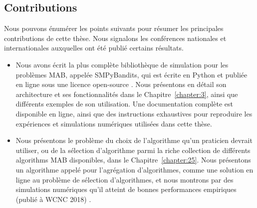 \begin{resume_fr}
\section*{Contributions}

Nous pouvons énumérer les points suivants pour résumer les principales contributions de cette thèse.
Nous signalons les conférences nationales et internationales auxquelles ont été publié certains résultats.

\begin{itemize}


    \item
    Nous avons écrit la plus complète bibliothèque de simulation pour les problèmes MAB, appelée SMPyBandits, qui est écrite en Python et publiée en ligne sous une licence open-source \cite{SMPyBanditsJMLR,SMPyBandits}.
    Nous présentons en détail son architecture et ses fonctionnalités dans le Chapitre~\ref{chapter:3}, ainsi que différents exemples de son utilisation.
    Une documentation complète est disponible en ligne, ainsi que des instructions exhaustives pour reproduire les expériences et simulations numériques utilisées dans cette thèse.

    \item
    Nous présentons le problème du choix de l'algorithme qu'un praticien devrait utiliser, ou de la sélection d'algorithme parmi la riche collection de différents algorithms MAB disponibles, dans le Chapitre~\ref{chapter:25}.
    Nous présentons un algorithme appelé \Aggr{} pour l'agrégation d'algorithmes, comme une solution en ligne au problème de sélection d'algorithmes, et nous montrons par des simulations numériques qu'il atteint de bonnes performances empiriques
    (publié à WCNC 2018) \cite{Besson2018WCNC}.


\end{itemize}
\end{resume_fr}
